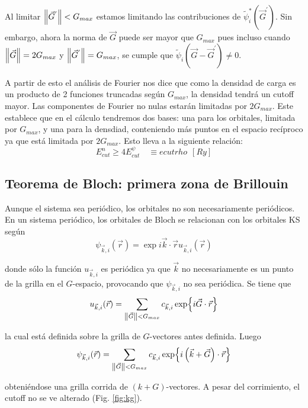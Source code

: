   Al limitar $\norm{\vec{G}^{'}} < G_{max}$ estamos limitando las contribuciones de $\tilde{\psi}_i^{*} (\vec{G}^{'})$. Sin embargo, ahora la norma de $\vec{G}$ puede ser mayor que $G_{max}$ pues incluso cuando $\norm{\vec{G}} = 2 G_{max}$ y $\norm{\vec{G}^{'}} =  G_{max}$, se cumple que $\tilde{\psi}_i (\vec{G} - \vec{G}^{'}) \neq 0$.

  A partir de esto el análisis de Fourier nos dice que como la densidad de carga es un producto de 2 funciones truncadas según $G_{max}$, la densidad tendrá un cutoff mayor. Las componentes de Fourier no nulas estarán limitadas por $2G_{max}$. Este establece que en el cálculo tendremos dos bases: una para los orbitales, limitada por $G_{max}$, y una para la densdiad, conteniendo más puntos en el espacio recíproco ya que está limitada por $2G_{max}$. Esto lleva a la siguiente relación:
    $$E_{cut}^{n} \geq 4 E_{cut}^{\psi} \quad \equiv ecutrho\ \ [Ry]$$


\subsection{Teorema de Bloch: primera zona de Brillouin}

  Aunque el sistema sea periódico, los orbitales no son necesariamente periódicos. En un sistema periódico, los orbitales de Bloch se relacionan con los orbitales KS según
    $$\psi_{\vec{k},i} (\vec{r}) = \exp{i \vec{k} \cdot \vec{r}} u_{\vec{k},i} (\vec{r})$$

  donde sólo la función $u_{\vec{k},i}$ es periódica ya que $\vec{k}$ no necesariamente es un punto de la grilla en el $G$-espacio, provocando que $\psi_{\vec{k},i}$ no sea periódica. Se tiene que
    $$u_{\vec{k},i} (\vec{r}) = \sum_{\norm{\vec{G}} < G_{max}} c_{\vec{k},i} \exp{i \vec{G} \cdot \vec{r}}$$

  la cual está definida sobre la grilla de $G$-vectores antes definida. Luego
    $$\psi_{\vec{k},i} (\vec{r}) = \sum_{\norm{\vec{G}} < G_{max}} c_{\vec{k},i} \exp{i \left(\vec{k} + \vec{G}\right) \cdot \vec{r}} $$

  obteniéndose una grilla corrida de $(k+G)$-vectores. A pesar del corrimiento, el cutoff no se ve alterado (Fig. \ref{fig:kg}).

